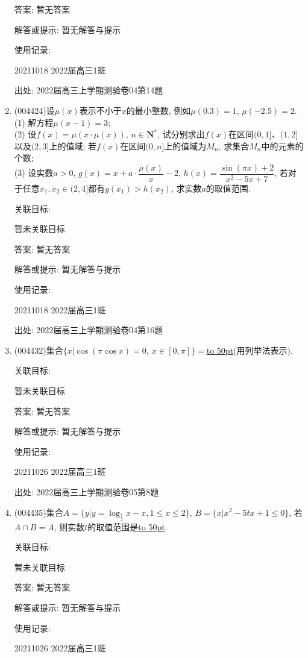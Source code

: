 \documentclass[10pt,a4paper]{article}
\newcommand{\blank}[1]{\underline{\hbox to #1pt{}}}
\begin{document}
\begin{enumerate}[1.]
答案: 暂无答案

解答或提示: 暂无解答与提示

使用记录:

20211018	2022届高三1班	


出处: 2022届高三上学期测验卷04第14题
\item { (004424)}设$\mu (x)$表示不小于$x$的最小整数, 例如$\mu(0.3)=1$, $\mu(-2.5)=2$.\\
(1) 解方程$\mu(x-1)=3$;\\
(2) 设$f(x)=\mu (x\cdot \mu (x))$, $n\in \mathbf{N}^*$, 试分别求出$f(x)$在区间$(0,1]$、$(1,2]$以及$(2,3]$上的值域; 若$f(x)$在区间$(0,n]$上的值域为$M_n$, 求集合$M_n$中的元素的个数;\\
(3) 设实数$a>0$, $g(x)=x+a\cdot \dfrac{\mu (x)}x-2$, $h(x)=\dfrac{\sin (\pi x)+2}{x^2-5x+7}$, 若对于任意$x_1,x_2\in (2,4]$都有$g(x_1)>h(x_2)$, 求实数$a$的取值范围.


关联目标:

暂未关联目标

答案: 暂无答案

解答或提示: 暂无解答与提示

使用记录:

20211018	2022届高三1班			


出处: 2022届高三上学期测验卷04第16题
\item { (004432)}集合$\{x|\cos(\pi \cos x)=0,\ x\in [0,\pi]\}=$\blank{50}(用列举法表示).


关联目标:

暂未关联目标

答案: 暂无答案

解答或提示: 暂无解答与提示

使用记录:

20211026	2022届高三1班	


出处: 2022届高三上学期测验卷05第8题
\item { (004435)}集合$A=\{y|y=\log_{\frac 12}x-x,1\le x\le 2\}$, $B=\{x|x^2-5tx+1\le 0\}$, 若$A\cap B=A$, 则实数$t$的取值范围是\blank{50}.


关联目标:

暂未关联目标

答案: 暂无答案

解答或提示: 暂无解答与提示

使用记录:

20211026	2022届高三1班	



\end{enumerate}
\end{document}
